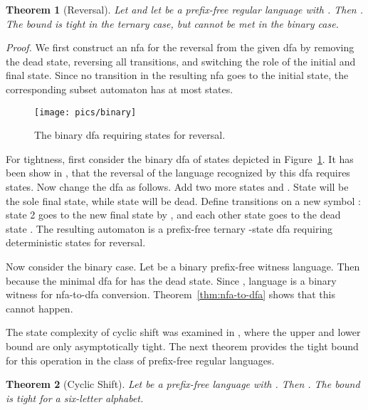 \documentclass[copyright]{eptcs}
\newtheorem{theorem}{Theorem}
\begin{document}
 \begin{theorem}[Reversal]\label{thm:sc_reversal}
  Let  and let  be a prefix-free regular language with .
  Then . The bound is tight in the ternary case,
  but cannot be met in the binary case. 
 \end{theorem}

 \noindent\emph{Proof.}
  We first construct an nfa for the reversal from the given dfa
  by removing the dead state,
  reversing all transitions,
  and switching the role of the initial and final state.
  Since no transition in the resulting nfa goes to the initial state,
  the corresponding subset automaton has at most   states.
  
  \begin{figure}[t]
  \centerline{\texttt{[image: pics/binary]}}
  \caption{The binary dfa requiring  states for reversal.}
  \label{fig:binary}
  \end{figure} 

  For tightness, first consider  the binary dfa of  states
  depicted in Figure~\ref{fig:binary}.
  It has been show in \cite{se10}, that the reversal of the language
  recognized by this dfa requires  states.
  Now change the dfa as follows.
  Add two more states  and .
  State  will be the sole final state, while state  will be dead.
  Define transitions on a new symbol :
  state 2 goes to the new final state  by ,
  and each other state  goes to the dead state .
  The resulting automaton is a prefix-free ternary -state dfa 
  requiring  deterministic states for reversal.
 
  Now consider the binary case. 
  Let  be a binary prefix-free witness language.
  Then  because  the minimal dfa for  has the dead state.
  Since ,  language 
  is a binary witness for  nfa-to-dfa conversion.
  Theorem~\ref{thm:nfa-to-dfa} shows that this cannot happen.
 \hfill\medskip

 The state complexity of cyclic shift was examined in \cite{jo08}, 
 where the upper and lower
 bound are only asymptotically tight. The next theorem provides the tight bound
 for this operation in the class of prefix-free regular languages.

 \begin{theorem}[Cyclic Shift]\label{thm:sc_cyclic}
  Let  be a prefix-free  language with .
  Then . The bound is tight
  for a six-letter alphabet. 
 \end{theorem}
\end{document}
